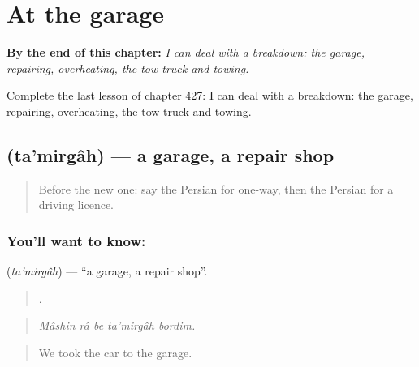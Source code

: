 
\chapter{At the garage}
\label{ch:fa-at-the-garage}

\begin{chapteropening}
\textbf{By the end of this chapter:} \emph{I can deal with a breakdown: the garage, repairing, overheating, the tow truck and towing.}

Complete the last lesson of chapter 427: I can deal with a breakdown: the garage, repairing, overheating, the tow truck and towing.
\end{chapteropening}

\section[\texorpdfstring{\fa{تعمیرگاه} (ta'mirgâh)}{تعمیرگاه (ta'mirgâh)}]{ (ta'mirgâh) — a garage, a repair shop}

\label{lesson:FA-C427-tamirgah}



\begin{quote}
Before the new one: say the Persian for one-way, then the Persian for a driving licence.
\end{quote}

\subsection*{You'll want to know: }
\textbf{} (\emph{ta'mirgâh}) — \textquotedblleft{}a garage, a repair shop\textquotedblright{}.

\begin{quote}
    .
\end{quote}

\begin{quote}
\emph{Mâshin râ be ta'mirgâh bordim.}
\end{quote}

\begin{quote}
We took the car to the garage.
\end{quote}

